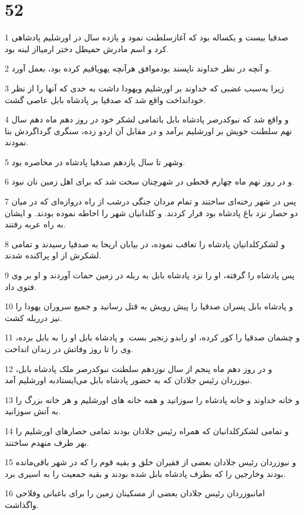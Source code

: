 \chapter{52}

\par 1 صدقیا بیست و یکساله بود که آغازسلطنت نمود و یازده سال در اورشلیم پادشاهی کرد و اسم مادرش حمیطل دختر ارمیااز لبنه بود.
\par 2 و آنچه در نظر خداوند ناپسند بودموافق هر‌آنچه یهویاقیم کرده بود، بعمل آورد.
\par 3 زیرا به‌سبب غضبی که خداوند بر اورشلیم ویهودا داشت به حدی که آنها را از نظر خودانداخت واقع شد که صدقیا بر پادشاه بابل عاصی گشت.
\par 4 و واقع شد که نبوکدرصر پادشاه بابل باتمامی لشکر خود در روز دهم ماه دهم سال نهم سلطنت خویش بر اورشلیم برآمد و در مقابل آن اردو زده، سنگری گرداگردش بنا نمودند.
\par 5 وشهر تا سال یازدهم صدقیا پادشاه در محاصره بود.
\par 6 و در روز نهم ماه چهارم قحطی در شهرچنان سخت شد که برای اهل زمین نان نبود.
\par 7 پس در شهر رخنه‌ای ساختند و تمام مردان جنگی درشب از راه دروازه‌ای که در میان دو حصار نزد باغ پادشاه بود فرار کردند. و کلدانیان شهر را احاطه نموده بودند. و ایشان به راه عربه رفتند.
\par 8 و لشکرکلدانیان پادشاه را تعاقب نموده، در بیابان اریحا به صدقیا رسیدند و تمامی لشکرش از او پراکنده شدند.
\par 9 پس پادشاه را گرفته، او را نزد پادشاه بابل به ربله در زمین حمات آوردند و او بر وی فتوی داد.
\par 10 و پادشاه بابل پسران صدقیا را پیش رویش به قتل رسانید و جمیع سروران یهودا را نیز درربله کشت.
\par 11 و چشمان صدقیا را کور کرده، او رابدو زنجیر بست. و پادشاه بابل او را به بابل برده، وی را تا روز وفاتش در زندان انداخت.
\par 12 و در روز دهم ماه پنجم از سال نوزدهم سلطنت نبوکدرصر ملک پادشاه بابل، نبوزردان رئیس جلادان که به حضور پادشاه بابل می‌ایستادبه اورشلیم آمد.
\par 13 و خانه خداوند و خانه پادشاه را سوزانید و همه خانه های اورشلیم و هر خانه بزرگ را به آتش سوزانید.
\par 14 و تمامی لشکرکلدانیان که همراه رئیس جلادان بودند تمامی حصارهای اورشلیم را بهر طرف منهدم ساختند.
\par 15 و نبوزردان رئیس جلادان بعضی از فقیران خلق و بقیه قوم را که در شهر باقی‌مانده بودند وخارجین را که بطرف پادشاه بابل شده بودند و بقیه جمعیت را به اسیری برد.
\par 16 امانبوزردان رئیس جلادان بعضی از مسکینان زمین را برای باغبانی وفلاحی واگذاشت.
